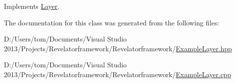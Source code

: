 Implements \hyperlink{class_layer_a1e7a6db5ee252c8ea9c44a21aaf2b0c9}{Layer}.



The documentation for this class was generated from the following files\-:\begin{DoxyCompactItemize}
\item 
D\-:/\-Users/tom/\-Documents/\-Visual Studio 2013/\-Projects/\-Revelatorframework/\-Revelatorframework/\hyperlink{_example_layer_8hpp}{Example\-Layer.\-hpp}\item 
D\-:/\-Users/tom/\-Documents/\-Visual Studio 2013/\-Projects/\-Revelatorframework/\-Revelatorframework/\hyperlink{_example_layer_8cpp}{Example\-Layer.\-cpp}\end{DoxyCompactItemize}
